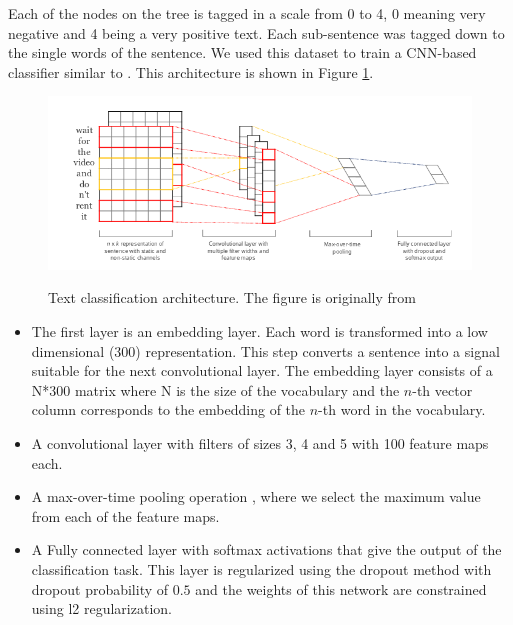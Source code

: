 Each of the nodes on the tree is tagged in a scale from 0 to 4, 0 meaning very negative and 4 being a very positive text. Each sub-sentence was tagged down to the single words of the sentence. We used this dataset to train a CNN-based classifier similar to \cite{DBLP:journals/corr/Kim14f}. This architecture is shown in Figure \ref{fig:cnn-sa}.

\begin{figure}[h]
    \centering
    \includegraphics[width=15cm]{figures/cnn}
    \label{fig:cnn-sa}
    \caption{Text classification architecture. The figure is originally from \cite{DBLP:journals/corr/Kim14f}}
\end{figure}


\begin{itemize}
    \item The first layer is an embedding layer. Each word is transformed into a low dimensional (300) representation. This step converts a sentence into a signal suitable for the next convolutional layer. The embedding layer consists of a N*300 matrix where N is the size of the vocabulary and the $n$-th vector column corresponds to the embedding of the $n$-th word in the vocabulary.
    \item A convolutional layer with filters of sizes 3, 4 and 5 with 100 feature maps each. 
    \item A max-over-time pooling operation \cite{collobert2011natural}, where we select the maximum value from each of the feature maps.
    \item A Fully connected layer with softmax activations that give the output of the classification task. This layer is regularized using the dropout method with dropout probability of $0.5$ \cite{srivastava2014dropout} and the weights of this network are constrained using l2 regularization.
\end{itemize}

